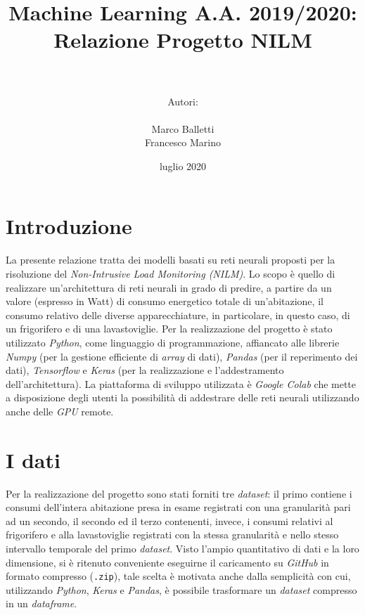 \documentclass[12pt,a4paper,fleqn]{article}
\date{\bigskip 22 luglio 2020}
\author{\\\\\LARGE Autori:\\\\\large Marco Balletti\\Francesco Marino}
\title{\LARGE \bfseries Machine Learning A.A. 2019/2020:\\Relazione Progetto NILM}
\begin{document}
\begin{titlepage}
\maketitle
\end{titlepage}
\tableofcontents
\pagebreak

\section{Introduzione}
La presente relazione tratta dei modelli basati su reti neurali proposti per la risoluzione del \textsl{Non-Intrusive Load Monitoring (NILM)}. Lo scopo è quello di realizzare un'architettura di reti neurali in grado di predire, a partire da un valore (espresso in Watt) di consumo energetico totale di un'abitazione, il consumo relativo delle diverse apparecchiature, in particolare, in questo caso, di un frigorifero e di una lavastoviglie. Per la realizzazione del progetto è stato utilizzato \textsl{Python}, come linguaggio di programmazione, affiancato alle librerie \textsl{Numpy} (per la gestione efficiente di \textsl{array} di dati), \textsl{Pandas} (per il reperimento dei dati), \textsl{Tensorflow} e \textsl{Keras} (per la realizzazione e l'addestramento dell'architettura). La piattaforma di sviluppo utilizzata è \textsl{Google Colab} che mette a disposizione degli utenti la possibilità di addestrare delle reti neurali utilizzando anche delle \textsl{GPU} remote.

\section{I dati}
Per la realizzazione del progetto sono stati forniti tre  \textsl{dataset}: il primo contiene i consumi dell'intera abitazione presa in esame registrati con una granularità pari ad un secondo, il secondo ed il terzo contenenti, invece, i consumi relativi al frigorifero e alla lavastoviglie registrati con la stessa granularità e nello stesso intervallo temporale del primo \textsl{dataset}. 
Visto l'ampio quantitativo di dati e la loro dimensione, si è ritenuto conveniente eseguirne il caricamento su \textsl{GitHub} in formato compresso (\texttt{.zip}), tale scelta è motivata anche dalla semplicità con cui, utilizzando \textsl{Python}, \textsl{Keras} e \textsl{Pandas}, è possibile trasformare un \textsl{dataset} compresso in un \textsl{dataframe}.
\end{document}
